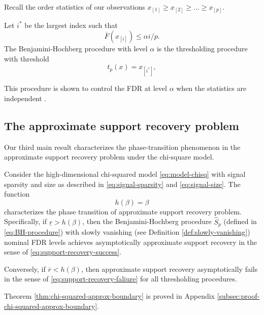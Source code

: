 Recall the order statistics of our observations $x_{[1]} \ge x_{[2]}  \ge \ldots \ge x_{[p]}$.

\begin{definition}
Let $i^*$ be the largest index such that
$$
\overline{F}(x_{[i]}) \le \alpha i/p.
$$
The Benjamini-Hochberg procedure with level $\alpha$ is the thresholding procedure with threshold
\begin{equation} \label{eq:BH-procedure}
    t_p(x) = x_{[i^*]},
\end{equation}
\end{definition}

This procedure is shown to control the FDR at level $\alpha$ when the statistics are
independent \cite{benjamini1995controlling}.

\subsection{The approximate support recovery problem}
\label{subsec:approx-support-recovery-boundary}

Our third main result characterizes the phase-transition phenomenon in the approximate support recovery problem under the chi-square model.

\begin{theorem} \label{thm:chi-squared-approx-boundary}
Consider the high-dimensional chi-squared model \eqref{eq:model-chisq} with signal sparsity and size as described in \eqref{eq:signal-sparsity} and \eqref{eq:signal-size}.
The function 
\begin{equation} \label{eq:weak-classification-boundary-chisquared}
    h(\beta) = \beta
\end{equation}
characterizes the phase transition of approximate support recovery problem.
Specifically, if $\underline{r} > {h}(\beta)$, then the Benjamini-Hochberg procedure $\widehat{S}_p$ (defined in \eqref{eq:BH-procedure}) with slowly vanishing (see Definition \ref{def:slowly-vanishing}) nominal FDR levels achieves asymptotically approximate support recovery in the sense of \eqref{eq:support-recovery-success}. 

Conversely, if $\overline{r} < {h}(\beta)$, then approximate support recovery asymptotically fails in the sense of \eqref{eq:support-recovery-faliure} for all thresholding procedures.
\end{theorem}

Theorem \ref{thm:chi-squared-approx-boundary} is proved in Appendix \ref{subsec:proof-chi-squared-approx-boundary}. 


